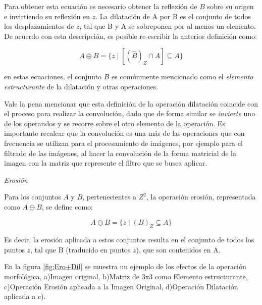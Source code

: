 Para obtener esta ecuación es necesario obtener la reflexión de $B$ sobre su origen e invirtiendo su reflexión en $z$. La dilatación de A por B es el conjunto de todos los desplazamientos de $z$, tal que B y A se sobreponen por al menos un elemento. De acuerdo con esta descripción, es posible re-escribir la anterior definición como:

\begin{equation}
A \oplus B = \{ z \mid [(\hat{B})_{Z} \cap A] \subseteq A \}
\label{eqn:dilatacion2}
\end{equation}

en estas ecuaciones, el conjunto $B$ es comúnmente mencionado como el \textit{elemento estructurante} de la dilatación y otras operaciones.

Vale la pena mencionar que esta definición de la operación dilatación coincide con el proceso para realizar la convolución, dado que de forma similar se \textit{invierte} uno de los operandos y se recorre sobre el otro elemento de la operación. Es importante recalcar que la convolución es una más de las operaciones que con frecuencia se utilizan para el procesamiento de imágenes, por ejemplo para el filtrado de las imágenes, al hacer la convolución de la forma matricial de la imagen con la matriz que represente el filtro que se busca aplicar. 

\emph{Erosión}


Para los conjuntos $A$ y $B$, pertenecientes a $Z^{2}$, la operación erosión, representada como $A \ominus B$, se define como:

\begin{equation*}
A \ominus B = \{ z \mid (B)_{Z} \subseteq A \}
\end{equation*}

Es decir, la erosión aplicada a estos conjuntos resulta en el conjunto de todos los puntos $z$, tal que B (traducido en puntos $z$), que son contenidos en A.

En la figura \ref{fig:Ero+Dil} se muestra un ejemplo de los efectos de la operación morfológica, a)Imagen original, b)Matriz de 3x3 como Elemento estructurante, c)Operación Erosión aplicada a la Imagen Original, d)Operación Dilatación aplicada a c).


